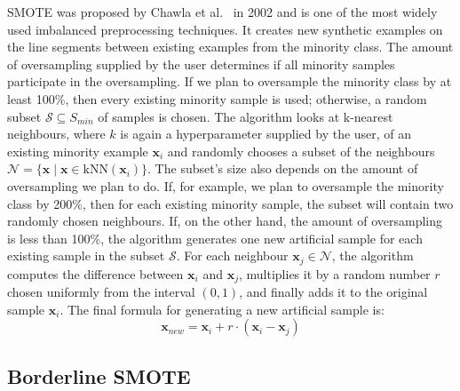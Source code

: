 SMOTE was proposed by Chawla et al.~\cite{smote} in 2002 and is one of the most widely used
imbalanced preprocessing techniques. It creates new synthetic examples on the line segments between
existing examples from the minority class. The amount of oversampling supplied by the user
determines if all minority samples participate in the oversampling. If we plan to oversample the
minority class by at least 100\%, then every existing minority sample is used; otherwise, a random
subset $\mathcal{S} \subseteq {S_{min}}$ of samples is chosen. The algorithm looks at k-nearest
neighbours, where $k$ is again a hyperparameter supplied by the user, of an existing minority
example $\mathbf{x}_i$ and randomly chooses a subset of the neighbours $\mathcal{N} = \{\mathbf{x}
\mid \mathbf{x} \in \mathrm{kNN}(\mathbf{x}_i)\}$. The subset's size also depends on the amount of
oversampling we plan to do. If, for example, we plan to oversample the minority class by 200\%,
then for each existing minority sample, the subset will contain two randomly chosen neighbours. If,
on the other hand, the amount of oversampling is less than 100\%, the algorithm generates one new
artificial sample for each existing sample in the subset $\mathcal{S}$. For each neighbour
$\mathbf{x}_j \in \mathcal{N}$, the algorithm computes the difference between $\mathbf{x}_i$ and
$\mathbf{x}_j$, multiplies it by a random number $r$ chosen uniformly from the interval $(0, 1)$,
and finally adds it to the original sample $\mathbf{x}_i$. The final formula for generating a new
artificial sample is:
\begin{equation}
    \mathbf{x}_{new} = \mathbf{x}_i + r \cdot (\mathbf{x}_i - \mathbf{x}_j)
    \label{equation:smote}
\end{equation}


\subsection{Borderline SMOTE}
\label{subsection:bordeline-smote}

